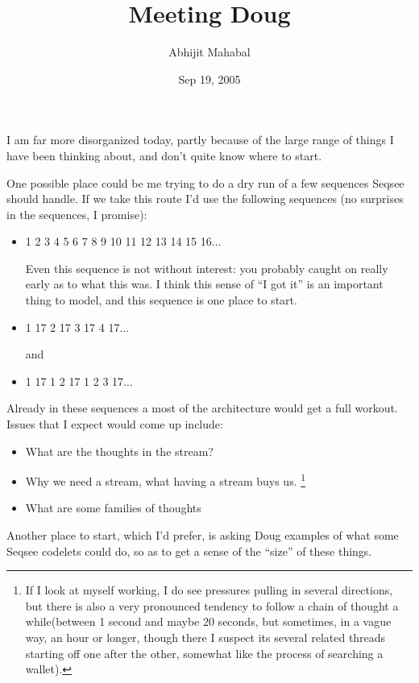 \documentclass{article}
\begin{document}
\title{Meeting Doug}
\date{Sep 19, 2005}
\author{Abhijit Mahabal}
\maketitle

I am far more disorganized today, partly because of the large range of things I have been thinking about, and don't quite know where to start.

One possible place could be me trying to do a dry run of a few sequences Seqsee should handle. If we take this route I'd use the following sequences (no surprises in the sequences, I promise):

\begin{itemize}
\item 1 2 3 4 5 6 7 8 9 10 11 12 13 14 15 16$\ldots$

Even this sequence is not without interest: you probably caught on really early as to what this was. I think this sense of ``I got it'' is an important thing to model, and this sequence is one place to start. 

\item 1 17 2 17 3 17 4 17$\ldots$

and

\item 1 17 1 2 17 1 2 3 17$\ldots$



\end{itemize}

Already in these sequences a most of the architecture would get a full workout. Issues that I expect would come up include:
\begin{itemize}
\item What are the thoughts in the stream?
\item Why we need a stream, what having a stream buys us. \footnote{If I look at myself working, I do see pressures pulling in several directions, but there is also a very pronounced tendency to follow a chain of thought a while(between 1 second and maybe 20 seconds, but sometimes, in a vague way, an hour or longer, though there I suspect its several related threads starting off one after the other, somewhat like the process of searching a wallet).}
\item What are some families of thoughts
\end{itemize}

Another place to start, which I'd prefer, is asking Doug examples of what some Seqsee codelets could do, so as to get a sense of the ``size'' of these things.
\end{document}
